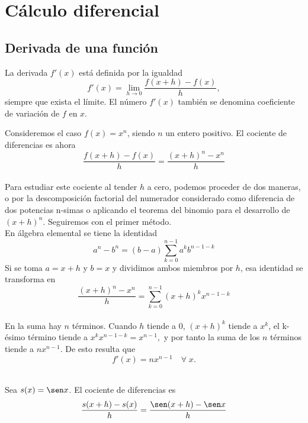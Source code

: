 \chapter{Cálculo diferencial}

\setcounter{section}{3}
\section{Derivada de una función}

\begin{tcolorbox}
    \begin{def.}
	La derivada $f'(x)$ está definida por la igualdad 
	$$f'(x)=\lim_{h\to 0}\dfrac{f(x+h)-f(x)}{h},$$
	siempre que exista el límite. El número $f'(x)$ también se denomina coeficiente de variación de $f$ en $x$.
    \end{def.}
\end{tcolorbox}
\vspace{.7cm}

\begin{ejem}
    Consideremos el caso $f(x)=x^n$, siendo $n$ un entero positivo. El cociente de diferencias es ahora\\
    $$\dfrac{f(x+h)-f(x)}{h}=\dfrac{(x+h)^n-x^n}{h}$$\\
    Para estudiar este cociente al tender $h$ a cero, podemos proceder de dos maneras, o por la descomposición factorial del numerador considerado como diferencia de dos potencias n-simas o aplicando el teorema del binomio para el desarrollo de $(x + h)^n$. Seguiremos con el primer método.\\

    En álgebra elemental se tiene la identidad
    $$a^n - b^n = (b-a)\sum_{k=0}^{n-1} a^k b^{n-1-k}$$
    Si se toma $a=x+h$ y $b=x$ y dividimos ambos miembros por $h$, esa identidad se transforma en \\
    $$\dfrac{(x+h)^n-x^n}{h} = \sum_{k=0}^{n-1}(x+h)^k x^{n-1-k}$$\\
    En la suma hay $n$ términos. Cuando $h$ tiende a $0$, $(x+h)^k$ tiende a $x^k$, el k-ésimo término tiende a $x^k x^{n-1-k}=x^{n-1},$ y por tanto la suma de los $n$ términos tiende a $nx^{n-1}$. De esto resulta que \\
    $$f'(x)=nx^{n-1}\quad \forall \; x.$$\\
\end{ejem}

\begin{ejem}
    Sea $s(x)=\sen x$. El cociente de diferencias es
    $$\dfrac{s(x+h)-s(x)}{h}=\dfrac{\sen(x+h)-\sen x}{h}$$
\end{ejem}
